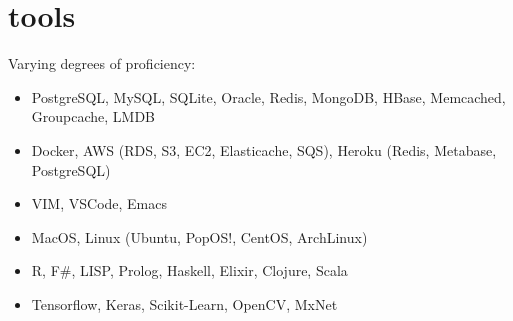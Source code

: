 \documentclass[]{friggeri-cv}
\begin{document}
\section{tools}
	Varying degrees of proficiency:
    	\begin{itemize}
		\item PostgreSQL, MySQL, SQLite, Oracle, Redis, MongoDB, HBase, Memcached, Groupcache, LMDB
		\item Docker, AWS (RDS, S3, EC2, Elasticache, SQS), Heroku (Redis, Metabase, PostgreSQL)
		\item VIM, VSCode, Emacs
		\item MacOS, Linux (Ubuntu, PopOS!, CentOS, ArchLinux)
		\item R, F\#, LISP, Prolog, Haskell, Elixir, Clojure, Scala 
		\item Tensorflow, Keras, Scikit-Learn, OpenCV, MxNet

	\end{itemize}
\end{document}
